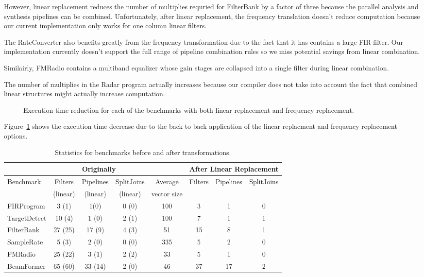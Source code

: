 However, linear replacement reduces the number of multiplies 
requried for FilterBank by a factor of three because the parallel analysis and 
synthesis pipelines can be combined. Unfortunately, after
linear replacement, the frequency translation doesn't reduce computation 
because our current implementation only works for one column linear filters.

The RateConverter also benefits greatly from the frequency transformation
due to the fact that it has contains a large FIR filter. Our implementation
currently doesn't support the full range of pipeline combination rules so
we miss potential savings from linear combination.

Similairly, FMRadio contains a multiband equalizer whose gain stages are collapsed
into a single filter during linear combination.

The number of multiplies in the Radar program actually increases because our 
compiler does not take into account the fact that combined linear structures 
might actually increase computation. %

\begin{figure}
\center
\epsfxsize=3.2in
\vspace{-6pt}
\caption{Execution time reduction for each of the benchmarks with both linear replacement and frequency replacement.}
\label{fig:execution-speedup}
\vspace{-12pt}
\end{figure}

Figure~\ref{fig:execution-speedup} shows the execution time decrease due to the back to back
application of the linear replacment and frequency replacement options.


\begin{table*}[t]
\begin{tabular}{|l|c|c|c||c||c|c|c|} 
\hline
          & \multicolumn{3}{|c||}{Originally}  &             & \multicolumn{3}{|c|}{After Linear Replacement} \\
\hline
Benchmark & Filters & Pipelines & SplitJoins & Average     & Filters      & Pipelines         & SplitJoins \\
          & (linear)& (linear)  & (linear)   & vector size &              &                   &            \\
\hline
FIRProgram & 3 (1) & 1(0) & 0 (0) & 100 & 3 & 1 & 0 \\
\hline
TargetDetect & 10 (4) & 1 (0) & 2 (1) & 100 & 7 & 1 & 1 \\
\hline
FilterBank & 27 (25) & 17 (9) & 4 (3) & 51 & 15 & 8 & 1 \\
\hline
SampleRate & 5 (3) & 2 (0) & 0 (0) & 335 & 5 & 2 & 0 \\
\hline
FMRadio & 25 (22) & 3 (1) & 2 (2) & 33 & 5 & 1 & 0 \\
\hline
BeamFormer & 65 (60) & 33 (14) & 2 (0) & 46 & 37 & 17 & 2\\
\hline
\end{tabular}
\caption{Statistics for benchmarks before and after transformations.}
\label{fig:benchmark-stastics}
\end{table*}
